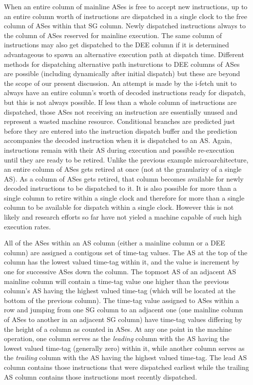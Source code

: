 \documentclass{book}
\begin{document}
When an entire column of mainline ASes
is free to accept new instructions, up
to an entire column worth of instructions are dispatched in a single
clock to the free column of ASes within that SG column.
Newly dispatched instructions always to the column of ASes
reserved for mainline execution.  The same column of instructions
may also get dispatched to the DEE column if it is determined
advantageous to spawn an alternative execution path at dispatch
time.  Different methods for dispatching alternative path
insturctions to DEE columns of ASes are possible (including
dynamically after initial dispatch) but these are beyond
the scope of our present discussion.
An attempt is made by the i-fetch unit to always have an entire
column's worth of decoded instructions ready for dispatch,
but this is not always possible.  If less than a whole column
of instructions are dispatched, those ASes not receiving an
instruction are essentially unused and represent a wasted
machine resource.
Conditional branches are
predicted just before they are entered into the instruction
dispatch buffer and the
prediction accompanies the decoded instruction
when it is dispatched to an AS.
Again, instructions remain with their AS during execution and
possible re-execution until they are ready to be retired.
Unlike the previous example microarchitecture, an entire
column of ASes gets retired at once (not at the granulariry of
a single AS).
As a column of ASes gets retired, that column becomes available
for newly decoded instructions to be dispatched to it.
It is also possible for more than a single column to retire
within a single clock and therefore for
more than a single column to be available for dispatch within
a single clock.  However this is not likely and research efforts
so far have not yieled a machine capable of such high execution
rates.

All of the ASes within an AS column (either a mainline column or a DEE
column) are assigned a contigous set of time-tag values.  The AS at the
top of the column has the lowest valued time-tag within it, and the
value is increment by one for successive ASes down the column.
The topmost AS of an adjacent AS mainline column will contain a
time-tag value one higher than the previous column's AS having the
highest valued time-tag (which will be located at the bottom of
the previous column).
The
time-tag value assigned to ASes within a row and jumping from one SG
column to an adjacent one (one mainline column of ASes to another in an
adjacent SG column) have time-tag values differing by the height of a
column as counted in ASes.  
At any one point in the machine operation,
one column serves as the \textit{leading} column with 
the AS having the lowest
valued time-tag (generally zero) within it, 
while another column serves as the \textit{trailing}
column with the AS having the highest valued time-tag.
The lead AS column contains those instructions that were dispatched
earliest while the trailing AS column contains those instructions
most recently dispatched.
\end{document}
